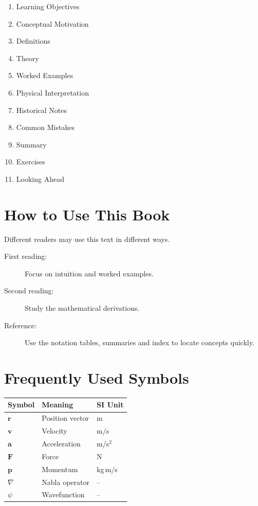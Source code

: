 \documentclass[11pt,a4paper,openany]{book}
\newcounter{example}[chapter]
\begin{document}
\begin{enumerate}
	\item Learning Objectives
	\item Conceptual Motivation
	\item Definitions
	\item Theory
	\item Worked Examples
	\item Physical Interpretation
	\item Historical Notes
	\item Common Mistakes
	\item Summary
	\item Exercises
	\item Looking Ahead
\end{enumerate}


\chapter*{How to Use This Book}

Different readers may use this text in different ways.

\begin{description}
	\item[First reading:] Focus on intuition and worked examples.
	\item[Second reading:] Study the mathematical derivations.
	\item[Reference:] Use the notation tables, summaries and index to locate concepts quickly.
\end{description}


\chapter*{Frequently Used Symbols}

\begin{tabular}{lll}
	\textbf{Symbol} & \textbf{Meaning} & \textbf{SI Unit}\\
	\hline
	$\mathbf r$ & Position vector & m\\
	$\mathbf v$ & Velocity & m/s\\
	$\mathbf a$ & Acceleration & m/s$^2$\\
	$\mathbf F$ & Force & N\\
	$\mathbf p$ & Momentum & kg\,m/s\\
	$\nabla$ & Nabla operator & --\\
	$\psi$ & Wavefunction & --\\
\end{tabular}
\end{document}
